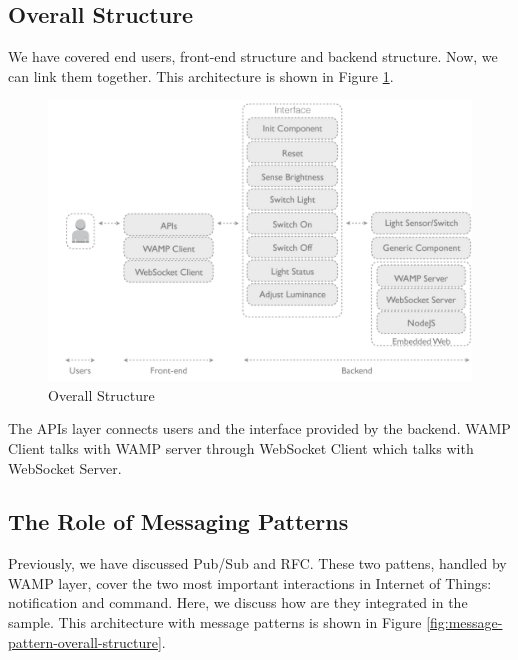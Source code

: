 \subsection{Overall Structure}
We have covered end users, front-end structure and backend structure. Now, we can link them together. This architecture is shown in Figure \ref{fig:communication-structure-with-user}.

\begin{figure}[ht]
  \begin{center}
    \includegraphics[width=1\textwidth]{images/communication-structure-with-user.pdf}
    \caption{Overall Structure}
    \label{fig:communication-structure-with-user}
  \end{center}
\end{figure}

The APIs layer connects users and the interface provided by the backend. WAMP Client talks with WAMP server through WebSocket Client which talks with WebSocket Server.

\subsection{The Role of Messaging Patterns}
Previously, we have discussed Pub/Sub and RFC. These two pattens, handled by WAMP layer, cover the two most important interactions in Internet of Things: notification and command. Here, we discuss how are they integrated in the sample. This architecture with message patterns is shown in Figure \ref{fig:message-pattern-overall-structure}.

